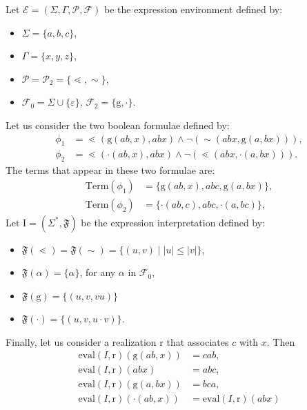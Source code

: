 \documentclass[a4paper]{llncs}
\begin{document}
  \begin{example}\label{ex inj form}
    Let $\mathcal{E}=(\Sigma,\Gamma,\mathcal{P},\mathcal{F})$ be the expression environment defined by:
    \begin{itemize}
      \item $\Sigma=\{a,b,c\}$,
      \item $\Gamma=\{x,y,z\}$,
      \item $\mathcal{P}=\mathcal{P}_2=\{\lessdot,\sim\}$,
      \item $\mathcal{F}_0=\Sigma\cup\{\varepsilon\}$, $\mathcal{F}_2=\{\mathrm{g},\cdot\}$.
    \end{itemize}
    Let us consider the two boolean formulae defined by:
        \begin{align*}
          \phi_1&=\lessdot(\mathrm{g}(ab,x),abx)\wedge \neg (\sim(abx,\mathrm{g}(a,bx))),\\
          \phi_2&=\lessdot(\cdot(ab,x),abx)\wedge \neg (\lessdot(abx,\cdot(a,bx))).
        \end{align*}
        The terms that appear in these two formulae are:
        \begin{align*}
          \mathrm{Term}(\phi_1)&=\{\mathrm{g}(ab,x),abc,\mathrm{g}(a,bx)\},\\
          \mathrm{Term}(\phi_2)&=\{\cdot(ab,c),abc,\cdot(a,bc)\},
        \end{align*}
        Let $\mathrm{I}=(\Sigma^*,\mathfrak{F})$ be the expression interpretation defined by:
    \begin{itemize}
      \item $\mathfrak{F}(\lessdot)=\mathfrak{F}(\sim)=\{(u,v)\mid |u|\leq |v| \}$,
      \item $\mathfrak{F}(\alpha)=\{\alpha\}$, for any $\alpha$ in $\mathcal{F}_0$, 
      \item $\mathfrak{F}(\mathrm{g})=\{(u,v,vu)\}$
      \item $\mathfrak{F}(\cdot)=\{(u,v,u\cdot v)\}$.
    \end{itemize} 
    Finally, let us consider a realization $\mathrm{r}$ that associates $c$ with $x$.  Then
        \begin{align*}
        \mathrm{eval}(I,\mathrm{r})(\mathrm{g}(ab,x))&=cab,\\
        \mathrm{eval}(I,\mathrm{r})(abx)&=abc,\\
        \mathrm{eval}(I,\mathrm{r})(\mathrm{g}(a,bx))&=bca,\\
        \mathrm{eval}(I,\mathrm{r})(\cdot(ab,x))&=\mathrm{eval}(I,\mathrm{r})(abx)\\

\end{align*}
\end{example}
\end{document}
